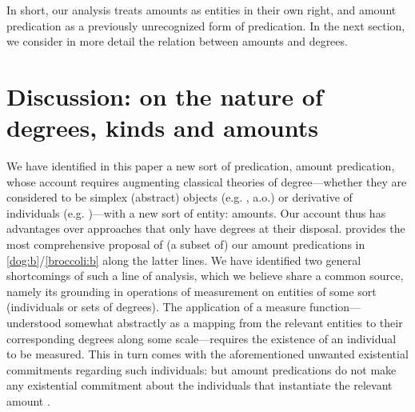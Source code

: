 \documentclass[a4paper,12pt,twoside]{article}
\newcommand{\posscitet}[1]{\citeauthor{#1}'s (\citeyear{#1})}
\begin{document}
	In short, our analysis treats amounts as entities in their own right, and amount predication as a previously unrecognized form of predication. In the next section, we consider in more detail the relation between amounts and degrees.
	
	\section{Discussion: on the nature of degrees, kinds and amounts}\label{sec:discussion}
	
	We have identified in this paper a new sort of predication, amount predication, whose account requires augmenting classical theories of degree---whether they are considered to be simplex (abstract) objects (e.g. \citealt{vonStechow:1984, Heim:2000}, a.o.) or derivative of individuals (e.g. \citealt{Cresswell:1977,Bale:2008})---with a new sort of entity: amounts. Our account thus has advantages over approaches that only have degrees at their disposal. \cite{Rett:2014,Rett:2018} provides the most comprehensive proposal of (a subset of) our amount predications in \ref{dog:b}/\ref{broccoli:b} along the latter lines. We have identified two general shortcomings of such a line of analysis, which we believe share a common source, namely its grounding in  operations of measurement on entities of some sort (individuals or sets of degrees). The application of a measure function---understood somewhat abstractly as a mapping  from the relevant entities to their  corresponding degrees along some scale---requires the existence of an individual to be measured. This in turn comes with the aforementioned unwanted existential commitments regarding such individuals: but amount predications do not make any existential commitment about the individuals that instantiate the relevant amount \citep{Mendia&Espinal:2024a}.   %
	
\end{document}
